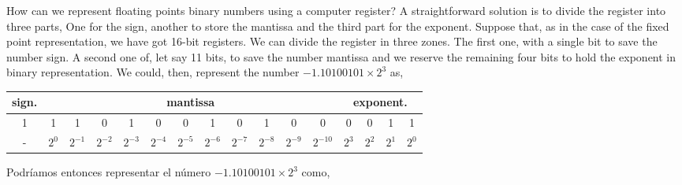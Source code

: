 \begin{paracol}{2}
 How can we represent floating points binary numbers using a computer register? A straightforward solution is to divide the register into three parts, One for the sign, another to store the mantissa and the third part for the exponent. Suppose that, as in the case of the fixed point representation, we have got 16-bit registers. We can divide the register in three zones. The first one, with a single bit to save the number sign. A second one of, let say 11 bits, to save the number mantissa and we reserve the remaining four bits to hold the exponent in binary representation. We could, then, represent the number $-1.10100101\times 2^3$ as,      
\end{paracol}

\begin{table}[h]
	\centering
\begin{tabular}{|c||c|c|c|c|c|c|c|c|c|c|c||c|c|c|c|}
\hline
sign.&\multicolumn{11}{c||}{mantissa}&\multicolumn{4}{c|}{exponent.}\\
\hline
1&1&1&0&1&0&0&1&0&1&0&0&0&0&1&1\\
\hline
-&$2^{0}$&$2^{-1}$&$2^{-2}$&$2^{-3}$&$2^{-4}$&$2^{-5}$&$2^{-6}$&$2^{-7}$&$2^{-8}$&$2^{-9}$&$2^{-10}$&$2^{3}$&$2^{2}$&$2^{1}$&$2^{0}$\\
\hline
\end{tabular}
\end{table}
Podríamos entonces representar el número  $-1.10100101\times 2^3$ como,
